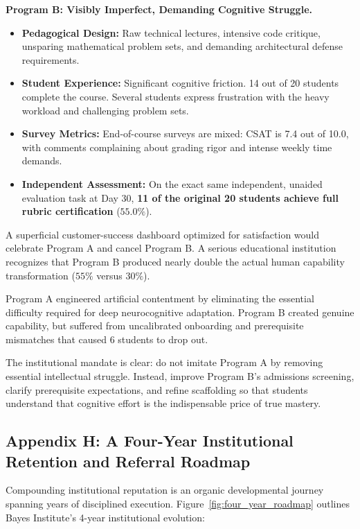 \textbf{Program B: Visibly Imperfect, Demanding Cognitive Struggle.}
\begin{itemize}[leftmargin=*]
\item \textbf{Pedagogical Design:} Raw technical lectures, intensive code critique, unsparing mathematical problem sets, and demanding architectural defense requirements.
\item \textbf{Student Experience:} Significant cognitive friction. 14 out of 20 students complete the course. Several students express frustration with the heavy workload and challenging problem sets.
\item \textbf{Survey Metrics:} End-of-course surveys are mixed: CSAT is 7.4 out of 10.0, with comments complaining about grading rigor and intense weekly time demands.
\item \textbf{Independent Assessment:} On the exact same independent, unaided evaluation task at Day 30, \textbf{11 of the original 20 students achieve full rubric certification} ($55.0\%$).
\end{itemize}

A superficial customer-success dashboard optimized for satisfaction would celebrate Program A and cancel Program B. A serious educational institution recognizes that Program B produced nearly double the actual human capability transformation ($55\%$ versus $30\%$). 

Program A engineered artificial contentment by eliminating the essential difficulty required for deep neurocognitive adaptation. Program B created genuine capability, but suffered from uncalibrated onboarding and prerequisite mismatches that caused 6 students to drop out. 

The institutional mandate is clear: do not imitate Program A by removing essential intellectual struggle. Instead, improve Program B's admissions screening, clarify prerequisite expectations, and refine scaffolding so that students understand that cognitive effort is the indispensable price of true mastery.

\subsection*{Appendix H: A Four-Year Institutional Retention and Referral Roadmap}

Compounding institutional reputation is an organic developmental journey spanning years of disciplined execution. Figure~\ref{fig:four_year_roadmap} outlines Bayes Institute's 4-year institutional evolution:

